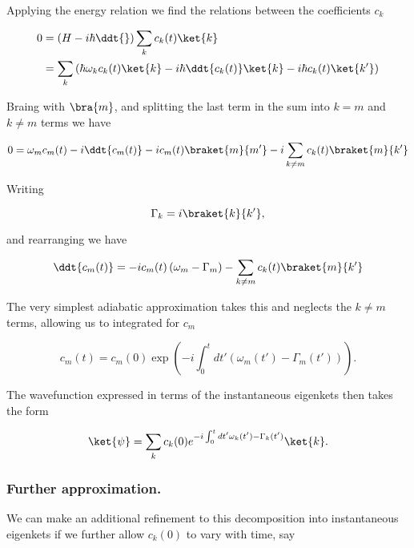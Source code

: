 Applying the energy relation we find the relations between the coefficients $c_k$

\begin{align*}
0 
&= \left( 
H - i \hbar \ddt{}
\right)
\sum_k c_k(t) \ket{k} 
\\
&= 
\sum_k 
\left(
\hbar \omega_k 
c_k(t) \ket{k} 
-i \hbar
\ddt{c_k(t)} \ket{k} 
-i \hbar
c_k(t) \ket{k'} 
\right)
\end{align*}

Braing with $\bra{m}$, and splitting the last term in the sum into $k = m$ and $k \ne m$ terms we have

\begin{equation}\label{eqn:qmTwoExamReflection:430}
0 
=
\omega_m 
c_m(t) 
-i 
\ddt{c_m(t)} 
-i 
c_m(t) \braket{m}{m'} 
-i 
\sum_{k \ne m}
c_k(t) \braket{m}{k'} 
\end{equation}

Writing

\begin{equation}\label{eqn:qmTwoExamReflection:450}
\Gamma_k = i \braket{k}{k'},
\end{equation}

and rearranging we have

\begin{equation}\label{eqn:qmTwoExamReflection:470}
\ddt{c_m(t)} 
=
-i c_m(t) 
\left( \omega_m - \Gamma_m \right)
- 
\sum_{k \ne m}
c_k(t) \braket{m}{k'} 
\end{equation}

The very simplest adiabatic approximation takes this and neglects the $k \ne m$ terms, allowing us to integrated for $c_m$

\begin{equation}\label{eqn:qmTwoExamReflection:490}
c_m(t)
=
c_m(0) \exp\left( -i \int_0^t dt' \left( \omega_m(t') - \Gamma_m(t') \right) \right).
\end{equation}

The wavefunction expressed in terms of the instantaneous eigenkets then takes the form

\begin{equation}\label{eqn:qmTwoExamReflection:510}
\ket{\psi}
=
\sum_k c_k(0) e^{-i \int_0^t dt' \omega_k(t') - \Gamma_k(t') } \ket{k}.
\end{equation}

\subsubsection{Further approximation.}
We can make an additional refinement to this decomposition into instantaneous eigenkets if we further allow $c_k(0)$ to vary with time, say

